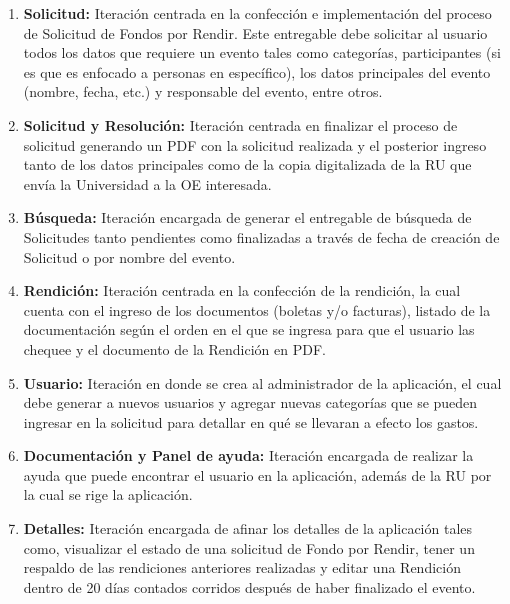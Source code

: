 \begin{enumerate}[label=\textbf{\arabic*}.]
    \item \textbf{Solicitud:} Iteración centrada en la confección e implementación del proceso de Solicitud de Fondos por Rendir. Este entregable debe solicitar al usuario todos los datos que requiere un evento tales como categorías, participantes (si es que es enfocado a personas en específico), los datos principales del evento (nombre, fecha, etc.) y responsable del evento, entre otros.
    \item \textbf{Solicitud y Resolución:} Iteración centrada en finalizar el proceso de solicitud generando un PDF con la solicitud realizada y el posterior ingreso tanto de los datos principales como de la copia digitalizada de la RU que envía la Universidad a la OE interesada.
    \item \textbf{Búsqueda:} Iteración encargada de generar el entregable de búsqueda de Solicitudes tanto pendientes como finalizadas a través de fecha de creación de Solicitud o por nombre del evento.
    \item \textbf{Rendición:} Iteración centrada en la confección de la rendición, la cual cuenta con el ingreso de los documentos (boletas y/o facturas), listado de la documentación según el orden en el que se ingresa para que el usuario las chequee y el documento de la Rendición en PDF.
    \item \textbf{Usuario:} Iteración en donde se crea al administrador de la aplicación, el cual debe generar a nuevos usuarios y agregar nuevas categorías que se pueden ingresar en la solicitud para detallar en qué se llevaran a efecto los gastos.
    \item \textbf{Documentación y Panel de ayuda:} Iteración encargada de realizar la ayuda que puede encontrar el usuario en la aplicación, además de la RU por la cual se rige la aplicación.
    \item \textbf{Detalles:} Iteración encargada de afinar los detalles de la aplicación tales como, visualizar el estado de una solicitud de Fondo por Rendir, tener un respaldo de las rendiciones anteriores realizadas y editar una Rendición dentro de 20 días contados corridos después de haber finalizado el evento.
\end{enumerate}

